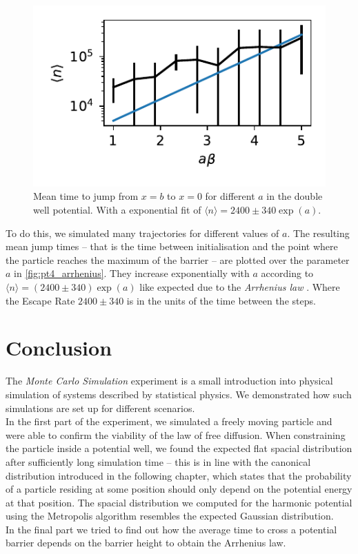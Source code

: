 \documentclass[
    parskip=half, 
    twoside=false,
    twocolumn=true,
    fontsize=11pt,
]{scrarticle}
\begin{document}
\begin{figure}
    \centering
    \includegraphics{figures/04 chem.pdf}
    \caption{
        Mean time to jump from $x=b$ to $x=0$ for different $a$ in the double well potential.
        With a exponential fit of $\langle n \rangle = 2400\pm 340 \exp\left(a\right)$.
    }
    \label{fig:pt4_arrhenius}
\end{figure}
To do this, we simulated many trajectories for different values of $a$. The resulting mean jump times -- that is the time between initialisation and the point where the particle reaches the maximum of the barrier -- are plotted over the parameter $a$ in \autoref{fig:pt4_arrhenius}. They increase exponentially with $a$ according to $\langle n \rangle = (2400\pm 340) \exp\left(a\right)$ like expected due to the \textit{Arrhenius law} \autocite{noauthor_arrhenius_2024}.
Where the Escape Rate $2400\pm 340$ is in the units of the time between the steps.

\pagebreak
\section{Conclusion}
The \textit{Monte Carlo Simulation} experiment is a small introduction into physical simulation of systems described by statistical physics. We demonstrated how such simulations are set up for different scenarios.\\
In the first part of the experiment, we simulated a freely moving particle and were able to confirm the viability of the law of free diffusion. 
When constraining the particle inside a potential well, we found the expected flat spacial distribution after sufficiently long simulation time -- this is in line with the canonical distribution introduced in the following chapter, which states that the probability of a particle residing at some position should only depend on the potential energy at that position.
The spacial distribution we computed for the harmonic potential using the Metropolis algorithm resembles the expected Gaussian distribution.\\
In the final part we tried to find out how the average time to cross a potential barrier depends on the barrier height to obtain the Arrhenius law. 

\nocite{*}
\printbibliography
\end{document}
